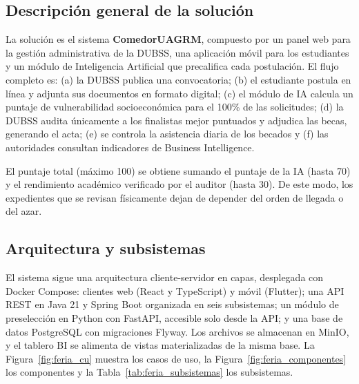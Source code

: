\subsection{Descripción general de la solución}\label{sec:feria_solucion}

La solución es el sistema \textbf{ComedorUAGRM}, compuesto por un panel web para la gestión administrativa de la DUBSS, una aplicación móvil para los estudiantes y un módulo de Inteligencia Artificial que precalifica cada postulación. El flujo completo es: (a) la DUBSS publica una convocatoria; (b) el estudiante postula en línea y adjunta sus documentos en formato digital; (c) el módulo de IA calcula un puntaje de vulnerabilidad socioeconómica para el 100\% de las solicitudes; (d) la DUBSS audita únicamente a los finalistas mejor puntuados y adjudica las becas, generando el acta; (e) se controla la asistencia diaria de los becados y (f) las autoridades consultan indicadores de Business Intelligence.

El puntaje total (máximo 100) se obtiene sumando el puntaje de la IA (hasta 70) y el rendimiento académico verificado por el auditor (hasta 30). De este modo, los expedientes que se revisan físicamente dejan de depender del orden de llegada o del azar.

\subsection{Arquitectura y subsistemas}\label{sec:feria_arquitectura}

El sistema sigue una arquitectura cliente-servidor en capas, desplegada con Docker Compose: clientes web (React y TypeScript) y móvil (Flutter); una API REST en Java 21 y Spring Boot organizada en seis subsistemas; un módulo de preselección en Python con FastAPI, accesible solo desde la API; y una base de datos PostgreSQL con migraciones Flyway. Los archivos se almacenan en MinIO, y el tablero BI se alimenta de vistas materializadas de la misma base. La Figura~\ref{fig:feria_cu} muestra los casos de uso, la Figura~\ref{fig:feria_componentes} los componentes y la Tabla~\ref{tab:feria_subsistemas} los subsistemas.

